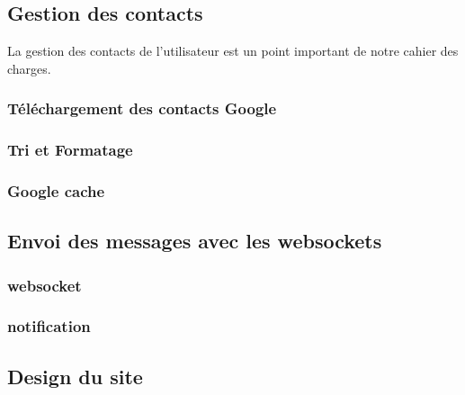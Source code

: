 \subsection{Gestion des contacts}

La gestion des contacts de l'utilisateur est un point important de notre cahier des charges.
\\

\subsubsection{Téléchargement des contacts Google}

\subsubsection{Tri et Formatage}

\subsubsection{Google cache}




\subsection{Envoi des messages avec les websockets}



\subsubsection{websocket}

\subsubsection{notification}



\subsection{Design du site}

